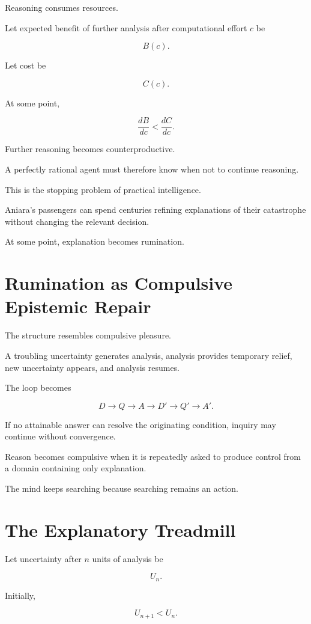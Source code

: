 \documentclass[11pt,oneside]{book}
\theoremstyle{definition}
\theoremstyle{remark}
\begin{document}
Reasoning consumes resources.

Let expected benefit of further analysis after computational effort \(c\) be

\[
B(c).
\]

Let cost be

\[
C(c).
\]

At some point,

\[
\frac{dB}{dc}
<
\frac{dC}{dc}.
\]

Further reasoning becomes counterproductive.

A perfectly rational agent must therefore know when not to continue reasoning.

This is the stopping problem of practical intelligence.

Aniara's passengers can spend centuries refining explanations of their catastrophe without changing the relevant decision.

At some point, explanation becomes rumination.

\section{Rumination as Compulsive Epistemic Repair}

The structure resembles compulsive pleasure.

A troubling uncertainty generates analysis, analysis provides temporary relief, new uncertainty appears, and analysis resumes.

The loop becomes

\[
D
\rightarrow
Q
\rightarrow
A
\rightarrow
D'
\rightarrow
Q'
\rightarrow
A'.
\]

If no attainable answer can resolve the originating condition, inquiry may continue without convergence.

Reason becomes compulsive when it is repeatedly asked to produce control from a domain containing only explanation.

The mind keeps searching because searching remains an action.

\section{The Explanatory Treadmill}

Let uncertainty after \(n\) units of analysis be

\[
U_n.
\]

Initially,

\[
U_{n+1}<U_n.
\]
\end{document}
